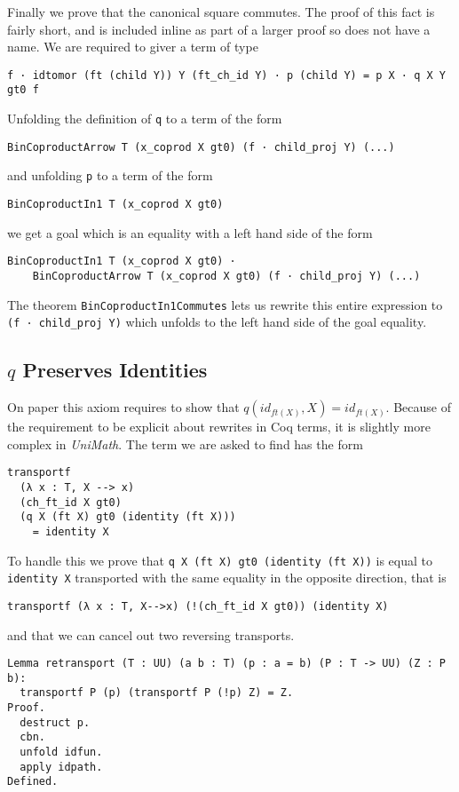 Finally we prove that the canonical square commutes. The proof of this fact is
fairly short, and is included inline as part of a larger proof so does not have
a name. We are required to giver a term of type
\begin{lstlisting}
f · idtomor (ft (child Y)) Y (ft_ch_id Y) · p (child Y) = p X · q X Y gt0 f
\end{lstlisting}
Unfolding the definition of \lstinline|q| to a term of the form
\begin{lstlisting}
BinCoproductArrow T (x_coprod X gt0) (f · child_proj Y) (...)
\end{lstlisting}
and unfolding \lstinline|p| to a term of the form
\begin{lstlisting}
BinCoproductIn1 T (x_coprod X gt0)
\end{lstlisting}
we get a goal which is an equality with a left hand side of the form
\begin{lstlisting}
BinCoproductIn1 T (x_coprod X gt0) · 
    BinCoproductArrow T (x_coprod X gt0) (f · child_proj Y) (...)
\end{lstlisting}
The theorem \lstinline|BinCoproductIn1Commutes| lets us rewrite this entire
expression to \lstinline|(f · child_proj Y)| which unfolds to the left hand side
of the goal equality.

\subsection{$q$ Preserves Identities}
On paper this axiom requires to show that $q(id_{ft(X)}, X) = id_{ft(X)}$.
Because of the requirement to be explicit about rewrites in Coq terms, it is
slightly more complex in \textit{UniMath}. The term we are asked to find has the
form
\begin{lstlisting}
transportf 
  (λ x : T, X --> x) 
  (ch_ft_id X gt0) 
  (q X (ft X) gt0 (identity (ft X))) 
    = identity X
\end{lstlisting}

To handle this we prove that \lstinline|q X (ft X) gt0 (identity (ft X))| is
equal to \lstinline|identity X| transported with the same equality in the
opposite direction, that is
\begin{lstlisting}
transportf (λ x : T, X-->x) (!(ch_ft_id X gt0)) (identity X)
\end{lstlisting}
and that we can cancel out two reversing transports.
\begin{lstlisting}
Lemma retransport (T : UU) (a b : T) (p : a = b) (P : T -> UU) (Z : P b):
  transportf P (p) (transportf P (!p) Z) = Z.
Proof.
  destruct p.
  cbn.
  unfold idfun.
  apply idpath.
Defined.
\end{lstlisting}

